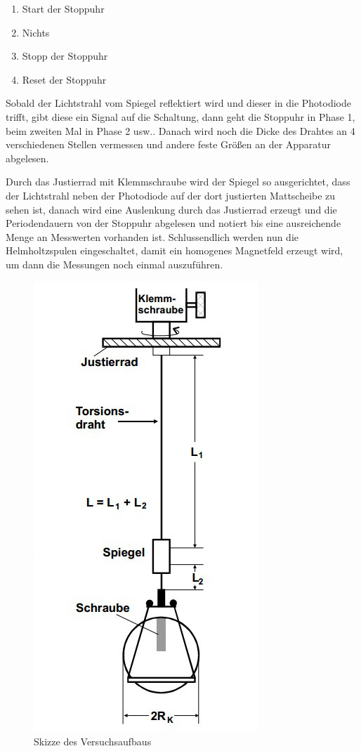     \begin{enumerate}
      \item{Start der Stoppuhr} 
      \item{\glqq Nichts\grqq\ } 
      \item{Stopp der Stoppuhr} 
      \item{Reset der Stoppuhr} 
    \end{enumerate}
    
    Sobald der Lichtstrahl vom Spiegel reflektiert wird und dieser in die Photodiode trifft, gibt 
    diese ein Signal auf die Schaltung, dann geht die Stoppuhr in Phase 1, beim zweiten Mal in 
    Phase 2 usw..
    Danach wird noch die Dicke des Drahtes an 4 verschiedenen Stellen vermessen und 
    andere feste Größen an der Apparatur abgelesen.
    
    Durch das Justierrad mit Klemmschraube wird der Spiegel so ausgerichtet, dass der 
    Lichtstrahl neben der Photodiode auf der dort justierten Mattscheibe zu sehen ist, danach wird 
    eine Auslenkung durch  
    das Justierrad erzeugt und die Periodendauern von der Stoppuhr abgelesen und notiert bis 
    eine ausreichende Menge an Messwerten vorhanden ist.  
    Schlussendlich werden nun die Helmholtzspulen eingeschaltet, damit ein homogenes 
    Magnetfeld erzeugt wird, um dann die Messungen noch einmal auszuführen.
    \begin{figure}[B]
      \centering
      \includegraphics[scale = 0.65]{Grafik/Versuchsaufbau.jpg}%
      \caption{Skizze des Versuchsaufbaus}
      \label{Aufbau}%
    \end{figure}
    
